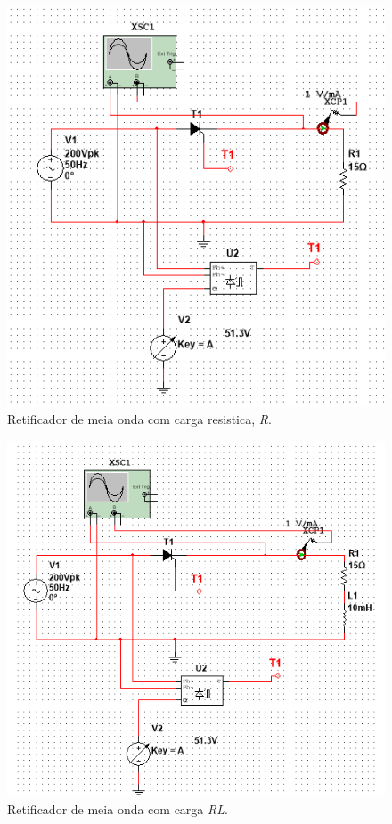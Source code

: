 \documentclass[a4paper,11pt]{article}
\numberwithin{equation}{section}
\begin{document}
\begin{figure}[h]
	\centering
	\includegraphics[keepaspectratio=true, scale=0.5]{img/circuito1}
	\caption{Retificador de meia onda com carga resistica, \textit{R}.}
	\label{fig:circuit_3}
	\vspace{-0.8em}
\end{figure}

\begin{figure}[h]
	\centering
	\includegraphics[keepaspectratio=true, scale=0.5]{img/circuito2}
	\caption{Retificador de meia onda com carga \textit{RL}.}
	\label{fig:circuit_4}
	\vspace{-0.8em}
\end{figure}
\end{document}
